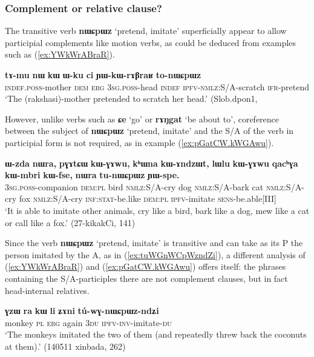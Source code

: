 \documentclass[oldfontcommands,oneside,a4paper,11pt]{article}
\newcommand{\ipa}[1]{\textbf{\phon#1}} %
\newcommand{\jpg}[2]{\ipa{#1} `#2'} %
\begin{document}
\subsubsection{Complement or relative clause?}
The transitive verb \jpg{nɯɕpɯz}{pretend, imitate} superficially appear to allow participial complements like motion verbs, as could be deduced from examples such as (\ref{ex:YWkWrABraR}). 

\begin{exe}
\ex \label{ex:YWkWrABraR}
\gll \ipa{tɤ-mu} 	\ipa{nɯ} 	\ipa{kɯ} 	\ipa{ɯ-ku} 	\ipa{ci} 	\ipa{ɲɯ-kɯ-rɤβraʁ} 	\ipa{to-nɯɕpɯz} \\
\textsc{indef.poss}-mother \textsc{dem} \textsc{erg} \textsc{3sg.poss}-head \textsc{indef} \textsc{ipfv-nmlz}:S/A-scratch \textsc{ifr}-pretend \\
\glt `The (rakshasi)-mother pretended to scratch her head.' (Slob.dpon1, 
\end{exe}

However, unlike verbs such as \jpg{ɕe}{go} or \jpg{rɤŋgat}{be about to},  coreference between the subject of \jpg{nɯɕpɯz}{pretend, imitate} and the S/A of the verb in participial form is not required, as in example (\ref{ex:pGatCW.kWGAwu}).

\begin{exe}
\ex \label{ex:pGatCW.kWGAwu}
\gll  \ipa{ɯ-zda} 	\ipa{nɯra,} 	\ipa{pɣɤtɕɯ} 	\ipa{kɯ-ɣɤwu,} 	\ipa{kʰɯna} 	\ipa{kɯ-ɤndzɯt,} 	\ipa{lɯlu} 	\ipa{kɯ-ɣɤwu} 	\ipa{qacʰɣa} 	\ipa{kɯ-mbri} 	\ipa{kɯ-fse,} 	\ipa{nɯra} 	\ipa{tu-nɯɕpɯz} 	\ipa{ɲɯ-spe.} \\
\textsc{3sg.poss}-companion \textsc{dem:pl} bird \textsc{nmlz}:S/A-cry dog \textsc{nmlz}:S/A-bark cat \textsc{nmlz}:S/A-cry fox \textsc{nmlz}:S/A-cry \textsc{inf:stat}-be.like \textsc{dem:pl} \textsc{ipfv}-imitate \textsc{sens}-be.able[III] \\
\glt `It is able to imitate other animals, cry like a bird, bark like a dog, mew like a cat or call like a fox.' (27-kikakCi, 141)
\end{exe}

Since the verb \jpg{nɯɕpɯz}{pretend, imitate} is transitive and can take as its P the person imitated by the A, as in (\ref{ex:tuWGnWCpWzndZi}), a different analysis of (\ref{ex:YWkWrABraR}) and (\ref{ex:pGatCW.kWGAwu}) offers itself: the phrases containing the S/A-participles there are not complement clauses, but in fact head-internal relatives.

\begin{exe}
\ex \label{ex:tuWGnWCpWzndZi}
\gll \ipa{ɣzɯ} 	\ipa{ra} 	\ipa{kɯ} 	\ipa{li} 	\ipa{ʑɤni} 	\ipa{tú-wɣ-nɯɕpɯz-ndʑi} \\
monkey \textsc{pl} \textsc{erg} again \textsc{3du} \textsc{ipfv-inv}-imitate-\textsc{du} \\
\glt `The monkeys imitated the two of them (and repeatedly threw back the coconuts at them).' (140511 xinbada, 262)
\end{exe} 
\end{document}
